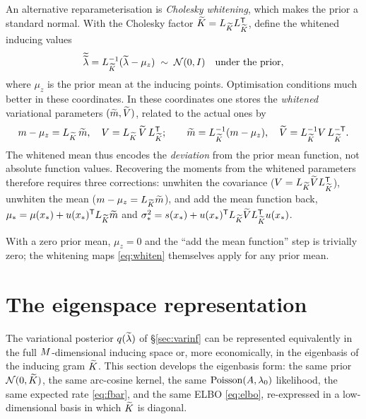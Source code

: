 An alternative reparameterisation is \emph{Cholesky whitening}, which makes the
prior a standard normal. With the Cholesky factor $\widetilde{K}=L_{\widetilde{K}}L_{\widetilde{K}}^{\mathsf{T}}$,
define the whitened inducing values
\begin{equation}
  \widetilde{\widetilde{\lambda}}=L_{\widetilde{K}}^{-1}(\widetilde{\lambda}-\mu_z)\;\sim\;\mathcal{N}(0,I)\quad\text{under the prior},
\end{equation}
where $\mu_z$ is the prior mean at the inducing points. Optimisation conditions
much better in these coordinates. In these coordinates one stores the
\emph{whitened} variational parameters $(\widetilde{m},\widetilde{V})$,
related to the actual ones by
\begin{equation}
  m-\mu_z=L_{\widetilde{K}}\,\widetilde{m},\quad V=L_{\widetilde{K}}\,\widetilde{V}\,L_{\widetilde{K}}^{\mathsf{T}};
  \qquad
  \widetilde{m}=L_{\widetilde{K}}^{-1}(m-\mu_z),\quad \widetilde{V}=L_{\widetilde{K}}^{-1}V\,L_{\widetilde{K}}^{-\mathsf{T}}.
  \label{eq:whiten}
\end{equation}
The whitened mean thus encodes the \emph{deviation} from the prior mean function,
not absolute function values. Recovering the moments from the whitened parameters
therefore requires three corrections: unwhiten the covariance
($V=L_{\widetilde{K}}\widetilde{V}L_{\widetilde{K}}^{\mathsf{T}}$), unwhiten the mean
($m-\mu_z=L_{\widetilde{K}}\widetilde{m}$), and add the mean function back,
$\mu_\ast=\mu(x_\ast)+u(x_\ast)^{\mathsf{T}}L_{\widetilde{K}}\widetilde{m}$ and
$\sigma^{2}_\ast=s(x_\ast)+u(x_\ast)^{\mathsf{T}}L_{\widetilde{K}}\widetilde{V}L_{\widetilde{K}}^{\mathsf{T}}u(x_\ast)$.

\begin{remark}
With a zero prior mean, $\mu_z=0$ and the ``add the mean function'' step is
trivially zero; the whitening maps \eqref{eq:whiten} themselves apply for any
prior mean.
\end{remark}


\section{The eigenspace representation}\label{sec:eigenspace}

The variational posterior $q(\widetilde{\lambda})$ of \S\ref{sec:varinf} can be represented
equivalently in the full $M$-dimensional inducing space or, more
economically, in the eigenbasis of the inducing gram $\widetilde{K}$. This section
develops the eigenbasis form: the same prior $\mathcal{N}(0,\widetilde{K})$, the same
arc-cosine kernel, the same $\mathrm{Poisson}(A,\lambda_{0})$ likelihood, the same expected
rate \eqref{eq:fbar}, and the same ELBO \eqref{eq:elbo}, re-expressed in a
low-dimensional basis in which $\widetilde{K}$ is diagonal.

